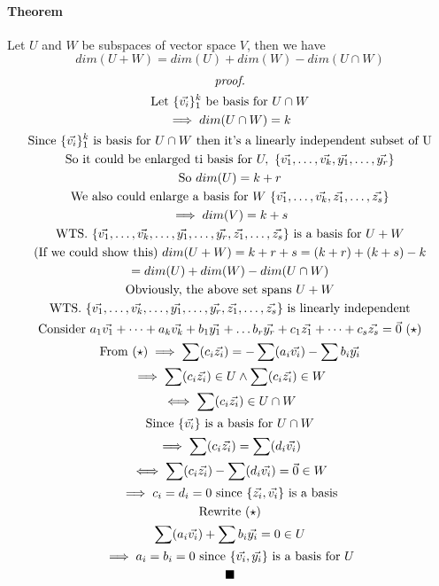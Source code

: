 \documentclass[11pt]{article}
\begin{document}
	\paragraph{Theorem} Let $U$ and $W$ be subspaces of vector space $V$, then we have
	\[
		dim(U + W) = dim(U) + dim(W) - dim(U \cap W)
	\]
	\begin{multline*}
		\emph{proof.}\\
		\text{Let } \{\vec{v_i}\}_1^k \text{ be basis for } U \cap W \\
		\implies dim(U \cap W) = k \\
		\text{Since }\{\vec{v_i}\}_1^k \text{ is basis for } U \cap W \text{ then it's a linearly independent subset of U} \\
		\text{So it could be enlarged ti basis for } U,\ \{\vec{v_1},\dots,\vec{v_k}, \vec{y_1},\dots,\vec{y_r}\} \\
		\text{So } dim(U) = k + r \\
		\text{We also could enlarge a basis for }W\ \{\vec{v_1},\dots,\vec{v_k}, \vec{z_1},\dots,\vec{z_s}\} \\
		\implies dim(V) = k + s \\
		\text{WTS. } \{\vec{v_1},\dots,\vec{v_k},\dots,\vec{y_1},\dots,\vec{y_r},\vec{z_1},\dots,\vec{z_s}\} \text{ is a basis for } U + W \\
		\text{(If we could show this) }dim(U+W) = k + r + s = (k + r) + (k + s) - k \\
		= dim(U) + dim(W) - dim(U\cap W)\\
		\text{Obviously, the above set spans } U + W \\
		\text{WTS. } \{\vec{v_1},\dots,\vec{v_k},\dots,\vec{y_1},\dots,\vec{y_r},\vec{z_1},\dots,\vec{z_s}\} \text{ is linearly independent} \\
		\text{Consider }a_1\vec{v_1} + \dots + a_k\vec{v_k} + b_1\vec{y_1} + \dots b_r\vec{y_r} + c_1\vec{z_1} + \dots + c_s \vec{z_s} = \vec{0}\ (\star)\\
		\text{From }(\star) \implies \sum(c_i\vec{z_i}) = - \sum(a_i\vec{v_i}) - \sum{b_i\vec{y_i}} \\
		\implies \sum(c_i\vec{z_i}) \in U \land \sum(c_i\vec{z_i}) \in W \\
		\iff \sum(c_i\vec{z_i}) \in U \cap W \\
		\text{Since } \{\vec{v_i}\} \text{ is a basis for } U \cap W \\
		\implies \sum(c_i\vec{z_i}) = \sum(d_i\vec{v_i}) \\
		\iff \sum(c_i\vec{z_i}) - \sum(d_i\vec{v_i}) = \vec{0} \in W \\
		\implies c_i = d_i = 0 \text{ since } \{\vec{z_i},\vec{v_i}\} \text{ is a basis}\\
		\text{Rewrite }(\star) \\
		\sum(a_i\vec{v_i}) + \sum{b_i\vec{y_i}} = 0 \in U \\
		\implies a_i = b_i = 0 \text{ since } \{\vec{v_i},\vec{y_i}\} \text{ is a basis for } U \\
		\blacksquare
	\end{multline*}
\end{document}
